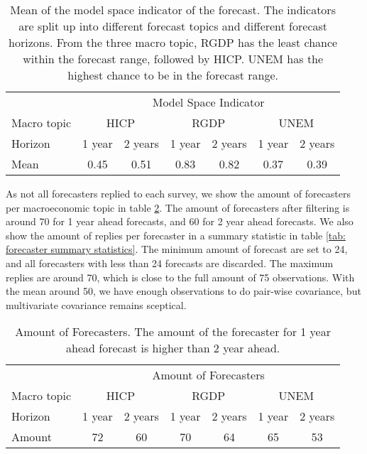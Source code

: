\documentclass[11pt]{article}
\begin{document}
\begin{table}[!h]
	\centering
	\caption{Mean of the model space indicator of the forecast. The indicators are split up into different forecast topics and different forecast horizons. From the three macro topic, RGDP has the least chance within the forecast range, followed by HICP. UNEM has the highest chance to be in the forecast range.}
	\label{tab: modelspace summary statistics}
	\begin{tabular}{lcccccc}
		\hline
		&\multicolumn{6}{c}{Model Space Indicator}\\
		\cmidrule(lr){2-7}
		Macro topic & \multicolumn{2}{c}{HICP} & \multicolumn{2}{c}{RGDP} & \multicolumn{2}{c}{UNEM} \\
		\cmidrule(lr){2-3} \cmidrule(lr){4-5}\cmidrule(lr){6-7}
		Horizon     & 1 year & 2 years & 1 year & 2 years & 1 year & 2 years \\ 
		\hline
		Mean        & 0.45        & 0.51         & 0.83        & 0.82        & 0.37         & 0.39       \\
		\hline
	\end{tabular}
\end{table}

As not all forecasters replied to each survey, we show the amount of forecasters per macroeconomic topic in table \ref{tab: amount of forecasters}. The amount of forecasters after filtering is around 70 for 1 year ahead forecasts, and 60 for 2 year ahead forecasts. We also show the amount of replies per forecaster in a summary statistic in table \ref{tab: forecaster summary statistics}. The minimum amount of forecast are set to 24, and all forecasters with less than 24 forecasts are discarded. The maximum replies are around 70, which is close to the full amount of 75 observations. With the mean around 50, we have enough observations to do pair-wise covariance, but multivariate covariance remains sceptical.

\begin{table}[!h]
	\centering
	\caption{Amount of Forecasters. The amount of the forecaster for 1 year ahead forecast is higher than 2 year ahead.}
	\label{tab: amount of forecasters}
	\begin{tabular}{lcccccc}
		\hline
		&\multicolumn{6}{c}{Amount of Forecasters}\\
		\cmidrule(lr){2-7}
		Macro topic & \multicolumn{2}{c}{HICP} & \multicolumn{2}{c}{RGDP} & \multicolumn{2}{c}{UNEM} \\
		\cmidrule(lr){2-3} \cmidrule(lr){4-5}\cmidrule(lr){6-7}
		Horizon     & 1 year & 2 years & 1 year & 2 years & 1 year & 2 years \\ 
		\hline
		Amount        &      72   &60          &70         &64         & 65         & 53       \\
		\hline
	\end{tabular}
\end{table}
\end{document}
